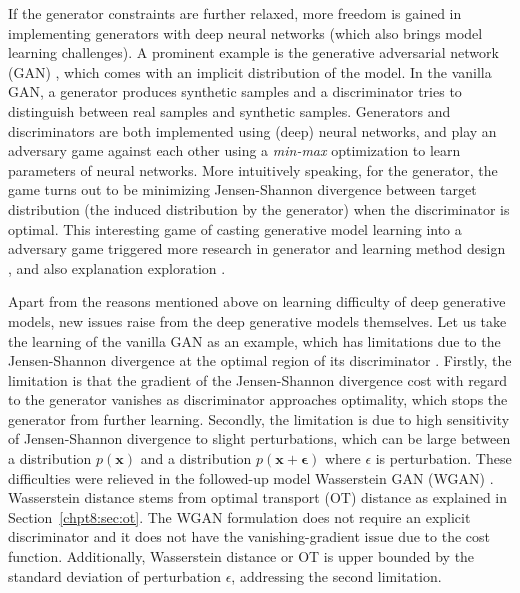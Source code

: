 If the generator constraints are further relaxed, more freedom is gained in implementing generators with deep neural networks (which also brings model learning challenges). A prominent example is the generative adversarial network (GAN) \cite{goodfellow2014gan}, which comes with an implicit distribution of the model.
In the vanilla GAN, a generator produces synthetic samples and a discriminator tries to distinguish between real samples and synthetic samples. Generators and discriminators are both implemented using (deep) neural networks, and play an adversary game against each other using a \textit{min-max} optimization to learn parameters of neural networks. More intuitively speaking, for the generator, the game turns out to be minimizing Jensen-Shannon divergence between target distribution (the induced distribution by the generator) when the discriminator is optimal.
This interesting game of casting generative model learning into a adversary game triggered more research in generator and learning method design
\cite{2015arXiv151106434R, 2015arXiv151106434R, 2018arXiv180205957M, 2018arXiv180508318Z, 2018arXiv180600880K, bang2018icml, DBLP:journals/corr/GhoshKNTD17, hoang2018mgan}, and also explanation exploration \cite{2017arXiv170104862A, 2017arXiv170107875A, 2018arXiv180607755X, 2017arXiv170104722M, NIPS2016_6399, li2018graphical}.

Apart from the reasons mentioned above on learning difficulty of deep generative models, new issues raise from the deep generative models themselves. Let us take the learning of the vanilla GAN as an example, which has limitations due to the Jensen-Shannon divergence at the optimal region of its discriminator \cite{2017arXiv170104862A}. Firstly, the limitation is that the gradient of the Jensen-Shannon divergence cost with regard to the generator vanishes as discriminator approaches optimality, which stops the generator from further learning. Secondly, the limitation is due to high sensitivity of Jensen-Shannon divergence to slight perturbations, which can be large between a distribution $p(\bm{x})$ and a distribution $p(\bm{x}+\bm{\epsilon})$ where $\epsilon$ is perturbation. These difficulties were relieved in the followed-up model Wasserstein GAN (WGAN) \cite{2017arXiv170107875A}. Wasserstein distance stems from optimal transport (OT) distance as explained in Section~\ref{chpt8:sec:ot}. The WGAN formulation does not require an explicit discriminator and it does not have the vanishing-gradient issue due to the cost function. Additionally, Wasserstein distance or OT is upper bounded by the standard deviation of perturbation $\epsilon$, addressing the second limitation.

